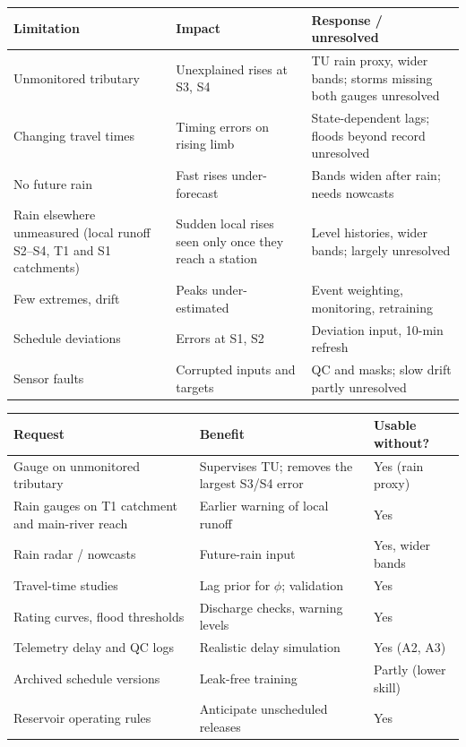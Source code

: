 \documentclass[11pt, a4paper]{article}
\begin{document}
\begin{center}\small
\begin{tabularx}{\textwidth}{@{}>{\raggedright\arraybackslash}p{2.9cm} >{\raggedright\arraybackslash}X >{\raggedright\arraybackslash}X@{}}
\toprule
Limitation & Impact & Response / unresolved\\
\midrule
Unmonitored tributary & Unexplained rises at S3, S4 & TU rain proxy, wider bands; storms missing both gauges unresolved\\
Changing travel times & Timing errors on rising limb & State-dependent lags; floods beyond record unresolved\\
No future rain & Fast rises under-forecast & Bands widen after rain; needs nowcasts\\
Rain elsewhere unmeasured (local runoff S2--S4, T1 and S1 catchments) & Sudden local rises seen only once they reach a station & Level histories, wider bands; largely unresolved\\
Few extremes, drift & Peaks under-estimated & Event weighting, monitoring, retraining\\
Schedule deviations & Errors at S1, S2 & Deviation input, 10-min refresh\\
Sensor faults & Corrupted inputs and targets & QC and masks; slow drift partly unresolved\\
\bottomrule
\end{tabularx}
\end{center}

\begin{center}\small
\begin{tabularx}{\textwidth}{@{}>{\raggedright\arraybackslash}p{4.2cm} X >{\raggedright\arraybackslash}p{2.6cm}@{}}
\toprule
Request & Benefit & Usable without?\\
\midrule
Gauge on unmonitored tributary & Supervises TU; removes the largest S3/S4 error & Yes (rain proxy)\\
Rain gauges on T1 catchment and main-river reach & Earlier warning of local runoff & Yes\\
Rain radar / nowcasts & Future-rain input & Yes, wider bands\\
Travel-time studies & Lag prior for $\phi$; validation & Yes\\
Rating curves, flood thresholds & Discharge checks, warning levels & Yes\\
Telemetry delay and QC logs & Realistic delay simulation & Yes (A2, A3)\\
Archived schedule versions & Leak-free training & Partly (lower skill)\\
Reservoir operating rules & Anticipate unscheduled releases & Yes\\
\bottomrule
\end{tabularx}
\end{center}
\end{document}
